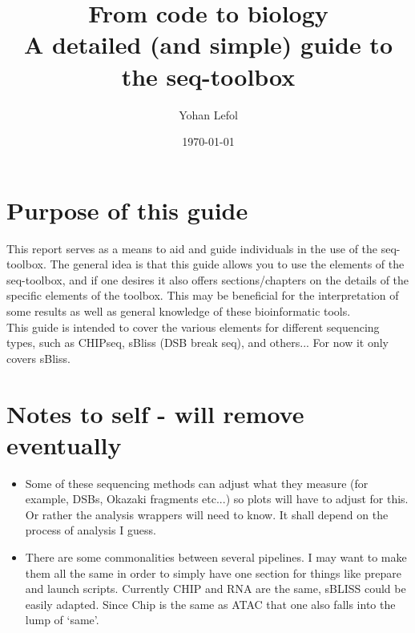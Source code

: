 \documentclass[11pt]{report}
\title{From code to biology \\ A detailed (and simple) guide to the seq-toolbox}
\author{Yohan Lefol}
\date{\today}
\begin{document}
\maketitle

\section*{Purpose of this guide}
\thispagestyle{empty}
This report serves as a means to aid and guide individuals in the use of the seq-toolbox. The general idea is that this guide allows you to use the elements of the seq-toolbox, and if one desires it also offers sections/chapters on the details of the specific elements of the toolbox. This may be beneficial for the interpretation of some results as well as general knowledge of these bioinformatic tools.\\
This guide is intended to cover the various elements for different sequencing types, such as CHIPseq, sBliss (DSB break seq), and others... For now it only covers sBliss.\\

\section*{Notes to self - will remove eventually}
\begin{itemize}
\item Some of these sequencing methods can adjust what they measure (for example, DSBs, Okazaki fragments etc...) so plots will have to adjust for this. Or rather the analysis wrappers will need to know. It shall depend on the process of analysis I guess.
\item There are some commonalities between several pipelines. I may want to make them all the same in order to simply have one section for things like prepare and launch scripts. Currently CHIP and RNA are the same, sBLISS could be easily adapted. Since Chip is the same as ATAC that one also falls into the lump of `same'.
\end{itemize}
\clearpage

{\small\tableofcontents}
\thispagestyle{empty}

\clearpage
\thispagestyle{empty}
\clearpage



















\clearpage


\end{document}
